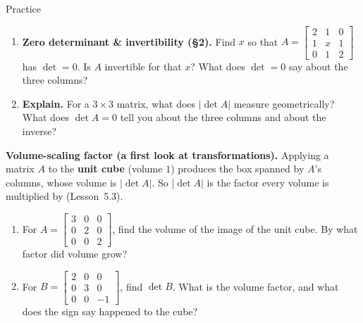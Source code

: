 \documentclass[10pt]{article}
\begin{document}
\begin{notesbox}{Practice}
\begin{enumerate}[leftmargin=1.9em, itemsep=11pt]
\begin{enumerate}[label=(\alph*), leftmargin=1.8em, itemsep=5pt]
      \item $\begin{bmatrix} 1 \\ 0 \\ 0 \end{bmatrix}, \begin{bmatrix} 2 \\ 3 \\ 0 \end{bmatrix}, \begin{bmatrix} 1 \\ 4 \\ 2 \end{bmatrix}$
    \end{enumerate}
    \vspace{1.1cm}
  \item \textbf{Zero determinant \& invertibility (§2).} Find $x$ so that
        $A=\begin{bmatrix} 2 & 1 & 0 \\ 1 & x & 1 \\ 0 & 1 & 2 \end{bmatrix}$ has $\det=0$.
        Is $A$ invertible for that $x$? What does $\det=0$ say about the three columns? 
  \item \textbf{Explain.} For a $3\times3$ matrix, what does $|\det A|$ measure geometrically? What does
        $\det A=0$ tell you about the three columns and about the inverse? 
\end{enumerate}
\end{notesbox}

\begin{extensionbox}
\textbf{Volume-scaling factor (a first look at transformations).} Applying a matrix $A$ to the
\textbf{unit cube} (volume $1$) produces the box spanned by $A$'s columns, whose volume is $|\det A|$.
So $|\det A|$ is the factor every volume is multiplied by (Lesson~5.3).
\begin{enumerate}[label=(\alph*), leftmargin=1.8em, itemsep=5pt]
  \item For $A=\begin{bmatrix} 3 & 0 & 0 \\ 0 & 2 & 0 \\ 0 & 0 & 2 \end{bmatrix}$, find the volume of the image of the unit cube. By what factor did volume grow?
  \item For $B=\begin{bmatrix} 2 & 0 & 0 \\ 0 & 3 & 0 \\ 0 & 0 & -1 \end{bmatrix}$, find $\det B$. What is the volume factor, and what does the sign say happened to the cube?
\end{enumerate}
\end{extensionbox}
\end{document}
